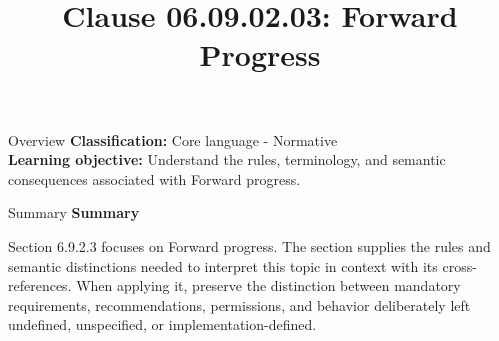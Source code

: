 \documentclass[10pt,letterpaper]{article}
\title{Clause 06.09.02.03: Forward Progress}
\author{}
\date{}
\begin{document}
\maketitle
\begin{CornellOverviewBox}{Overview}
\textbf{Classification:} Core language - Normative\\[2pt]
\textbf{Learning objective:} Understand the rules, terminology, and semantic consequences associated with Forward progress.
\end{CornellOverviewBox}\begin{CornellSummaryBox}{Summary}
{\sffamily\bfseries\color{Accent} Summary}\par\vspace{3pt}Section 6.9.2.3 focuses on Forward progress. The section supplies the rules and semantic distinctions needed to interpret this topic in context with its cross-references. When applying it, preserve the distinction between mandatory requirements, recommendations, permissions, and behavior deliberately left undefined, unspecified, or implementation-defined.
\end{CornellSummaryBox}
\end{document}
